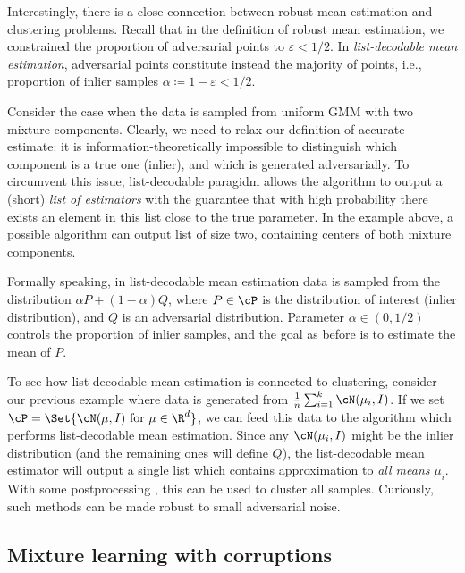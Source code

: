 Interestingly, there is a close connection between robust mean estimation and clustering problems.
Recall that in the definition of robust mean estimation, we constrained the proportion of adversarial points to \(\varepsilon < 1/2\).
In \emph{list-decodable mean estimation}, adversarial points constitute instead the majority of points, i.e., proportion of inlier samples \(\alpha \coloneqq 1 - \varepsilon < 1/2\).

Consider the case when the data is sampled from uniform GMM with two mixture components.
Clearly, we need to relax our definition of accurate estimate: it is information-theoretically impossible to distinguish which component is a true one (inlier), and which is generated adversarially.
To circumvent this issue, list-decodable paragidm  allows the algorithm to output a (short) \emph{list of estimators} 
with the guarantee that with high probability there exists an element in this list close to the true parameter.
In the example above, a possible algorithm can output list of size two, containing centers of both mixture components.

Formally speaking, in list-decodable mean estimation data is sampled from the distribution \(\alpha P + (1 - \alpha) Q\),
where \(P \in \cP\) is the distribution of interest (inlier distribution), and \(Q\) is an adversarial distribution.
Parameter \(\alpha \in (0, 1/2)\) controls the proportion of inlier samples, and the goal as before is to estimate the mean of \(P\).

To see how list-decodable mean estimation is connected to clustering, 
consider our previous example where data is generated from \(\frac{1}{n} \sum_{i=1}^k \cN(\mu_i, I)\).
If we set \(\cP = \Set{\cN(\mu, I) \text{ for } \mu \in \R^d}\), 
we can feed this data to the algorithm which performs list-decodable mean estimation.
Since any \(\cN(\mu_i, I)\) might be the inlier distribution (and the remaining ones will define \(Q\)),
the list-decodable mean estimator will output a single list which contains approximation to \emph{all means} \(\mu_i\).
With some postprocessing , this can be used to cluster all samples.
Curiously, such methods can be made robust to small adversarial noise. 
\subsection{Mixture learning with corruptions}

